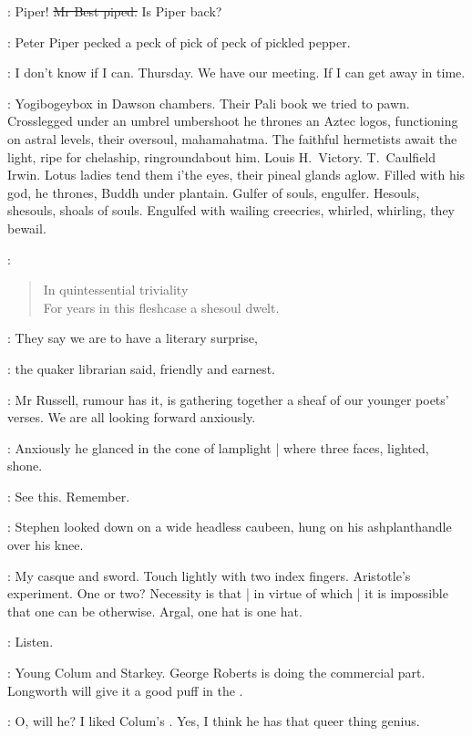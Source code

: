 \best:
Piper!
\sout{Mr Best piped.}
Is Piper back?

\StephenInt:
Peter Piper pecked a peck of pick of peck of pickled pepper.

\AErussell:
I don't know if I can.
Thursday.
We have our meeting.
If I can get away in time.

\StephenInt:
Yogibogeybox in Dawson chambers.
Their Pali book we tried to pawn.
Crosslegged under an umbrel umbershoot
he thrones an Aztec logos,
functioning on astral levels,
their oversoul,
mahamahatma.
The faithful hermetists await the light,
ripe for chelaship,
ringroundabout him.
Louis H.~Victory.
T.~Caulfield Irwin.
Lotus ladies tend them i'the eyes,
their pineal glands aglow.
Filled with his god,
he thrones,
Buddh under plantain.
Gulfer of souls, engulfer.
Hesouls, shesouls, shoals of souls.
Engulfed with wailing creecries,
whirled, whirling, they bewail.

\StephenInt:
\begin{verse}
    In quintessential triviality \\
    For years in this fleshcase a shesoul dwelt.
\end{verse}

\librarian:
They say we are to have a literary surprise,

:
the quaker librarian said,
friendly and earnest.

\librarian:
Mr Russell,
rumour has it,
is gathering together a sheaf of our younger poets' verses.
We are all looking forward anxiously.

:
Anxiously he glanced in the cone of lamplight |
where three faces, lighted, shone.

\StephenInt:
See this.
Remember.

:
Stephen looked down on a wide headless caubeen,
hung on his ashplant\-handle over his knee.

\StephenInt:
My casque and sword.
Touch lightly with two index fingers.
Aristotle's experiment.
One or two?
Necessity is that |
in virtue of which |
it is impossible that one can be otherwise.
Argal,
one hat is one hat.

\StephenInt:
Listen.

\eglinton:
Young Colum and Starkey.
George Roberts is doing the commercial part.
Longworth will give it a good puff in the .

\AErussell:
O, will he?
I liked Colum's .
Yes, I think he has that queer thing genius.

